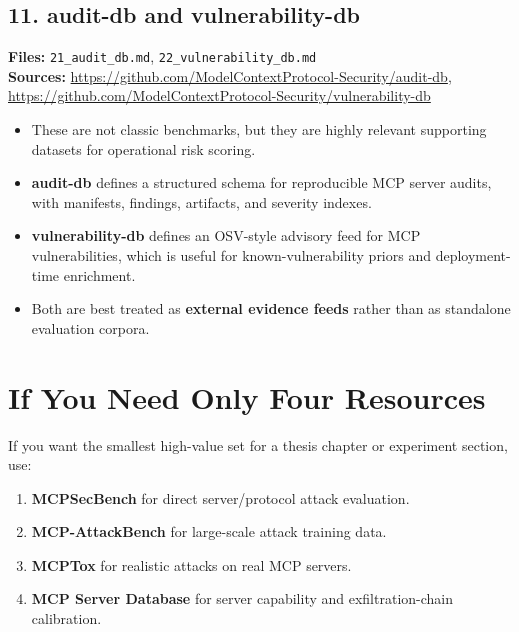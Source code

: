 \documentclass[11pt]{article}
\begin{document}
\subsection*{11. audit-db and vulnerability-db}
\textbf{Files:} \texttt{21\_audit\_db.md}, \texttt{22\_vulnerability\_db.md} \\
\textbf{Sources:} \url{https://github.com/ModelContextProtocol-Security/audit-db}, \url{https://github.com/ModelContextProtocol-Security/vulnerability-db}
\begin{itemize}[leftmargin=1.2em]
\item These are not classic benchmarks, but they are highly relevant supporting datasets for operational risk scoring.
\item \textbf{audit-db} defines a structured schema for reproducible MCP server audits, with manifests, findings, artifacts, and severity indexes.
\item \textbf{vulnerability-db} defines an OSV-style advisory feed for MCP vulnerabilities, which is useful for known-vulnerability priors and deployment-time enrichment.
\item Both are best treated as \textbf{external evidence feeds} rather than as standalone evaluation corpora.
\end{itemize}

\section*{If You Need Only Four Resources}
If you want the smallest high-value set for a thesis chapter or experiment section, use:
\begin{enumerate}[leftmargin=1.4em]
\item \textbf{MCPSecBench} for direct server/protocol attack evaluation.
\item \textbf{MCP-AttackBench} for large-scale attack training data.
\item \textbf{MCPTox} for realistic attacks on real MCP servers.
\item \textbf{MCP Server Database} for server capability and exfiltration-chain calibration.
\end{enumerate}
\end{document}
